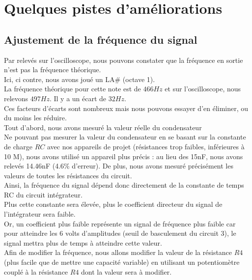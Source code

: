 \chapter{Quelques pistes d’améliorations}
\section{Ajustement de la fréquence du signal}

Par relevés sur l’oscilloscope, nous pouvons constater que la fréquence en sortie n’est pas la fréquence théorique. \\

Ici, ci contre, nous avons joué un LA\# (octave 1).\\
La fréquence théorique pour cette note est de $466 Hz$ et sur l’oscilloscope, nous relevons $497 Hz$. Il y a un écart de $32 Hz$. \\


Ces facteurs d’écarts sont nombreux mais nous pouvons essayer d’en éliminer, ou du moins les réduire. \\

Tout d’abord, nous avons mesuré la valeur réelle du condensateur \\
Ne pouvant pas mesurer la valeur du condensateur en se basant sur la constante de charge $RC$ avec nos appareils de projet (résistances trop faibles, inférieures à 10 M), nous avons utilisé un appareil plus précis : au lieu des 15nF, nous avons relevés 14.46nF (4.6\% d’erreur).
De plus, nous avons mesuré précisément les valeurs de toutes les résistances du circuit.\\

Ainsi, la fréquence du signal dépend donc directement de la constante de temps RC du circuit intégrateur. \\
Plus cette constante sera élevée, plus le coefficient directeur du signal de l’intégrateur sera faible. \\
Or, un coefficient plus faible représente un signal de fréquence plus faible car pour atteindre les 6 volts d’amplitudes (seuil de basculement du circuit 3), 
le signal mettra plus de temps à atteindre cette valeur.\\


Afin de modifier la fréquence, nous allons modifier la valeur de la résistance $R4$ (plus facile que de mettre une capacité variable) en utilisant un potentiomètre couplé à la résistance $R4$ dont la valeur sera à modifier.\\



